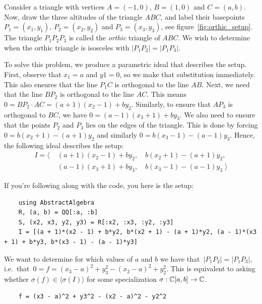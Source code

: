 \begin{example} \upshape
  Consider a triangle with vertices $A = (-1, 0)$, $B = (1, 0)$ and $C = (a, b)$. Now, draw the three altitudes of the triangle $ABC$, and label their basepoints $P_{1} = (x_{1}, y_{1})$, $P_{2} = (x_{2}, y_{2})$ and $P_{3} = (x_{3}, y_{3})$, see figure~\ref{fig:orthic_setup}. The triangle $P_{1}P_{2}P_{3}$ is called the \textit{orthic} triangle of $ABC$. We wish to determine when the orthic triangle is isosceles with $|P_{1}P_{2}| = |P_{1}P_{3}|$.

  To solve this problem, we produce a parametric ideal that describes the setup. First, observe that $x_{1} = a$ and $y1 = 0$, so we make that substitution immediately. This also ensures that the line $P_{1}C$ is orthogonal to the line $AB$. Next, we need that the line $BP_{2}$ is orthogonal to the line $AC$. This means $0 = BP_{2} \cdot AC = (a + 1)(x_{2} - 1) + b y_{2}$. Similarly, to ensure that $AP_{3}$ is orthogonal to $BC$, we have $0 = (a - 1)(x_{3} + 1) + b y_{3}$. We also need to ensure that the points $P_{2}$ and $P_{3}$ lies on the edges of the triangle. This is done by forcing $0 = b(x_{2} + 1) - (a + 1)y_{2}$ and similarly $0 = b(x_{3} - 1) - (a - 1)y_{3}$. Hence, the following ideal describes the setup:
  \begin{align*}
    I = \langle\; &(a + 1)(x_{2} - 1) + b y_{2}, \quad  b(x_{2} + 1) - (a + 1)y_{2}, \\
                  &(a - 1)(x_{3} + 1) + b y_{3}, \quad  b(x_{3} - 1) - (a - 1)y_{3} \; \rangle
  \end{align*}

  If you're following along with the code, you here is the setup:
  \begin{verbatim}
    using AbstractAlgebra
    R, (a, b) = QQ[:a, :b]
    S, (x2, x3, y2, y3) = R[:x2, :x3, :y2, :y3]
    I = [(a + 1)*(x2 - 1) + b*y2, b*(x2 + 1) - (a + 1)*y2, (a - 1)*(x3 + 1) + b*y3, b*(x3 - 1) - (a - 1)*y3]
  \end{verbatim}

  We want to determine for which values of $a$ and $b$ we have that $\,|P_{1} P_{2}| = |P_{1} P_{3}|$, i.e.\ that $\,0 = f = (x_{3} - a)^{2} + y_{3}^{2} - (x_{2} - a)^{2} + y_{2}^{2}$. This is equivalent to asking whether $\sigma(f) \in \langle \sigma(I) \rangle$ for some specialization $\sigma : \mathbb{C}[a, b] \to \mathbb{C}$.

  \begin{verbatim}
    f = (x3 - a)^2 + y3^2 - (x2 - a)^2 - y2^2
  \end{verbatim}



\end{example}
